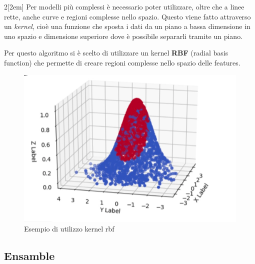 \documentclass[12pt,a4paper]{article}
\begin{document}
\begin{multicols}{2}[\columnsep2em]
    Per modelli più complessi è necessario poter utilizzare, oltre che a linee rette, anche curve e regioni complesse nello spazio.
    Questo viene fatto attraverso un \textit{kernel}, cioè una funzione che sposta i dati da un piano a bassa dimensione in uno spazio e dimensione superiore dove è possibile separarli tramite un piano.

    Per questo algoritmo si è scelto di utilizzare un kernel \textbf{RBF} (radial basis function) che permette di creare regioni complesse nello spazio delle features.
    \columnbreak

    \begin{figure}[H]
        \centering
        \includegraphics[width=1\linewidth]{rbf.png}
        \caption{Esempio di utilizzo kernel rbf}
    \end{figure}
\end{multicols}


\subsection{Ensamble}
\end{document}
